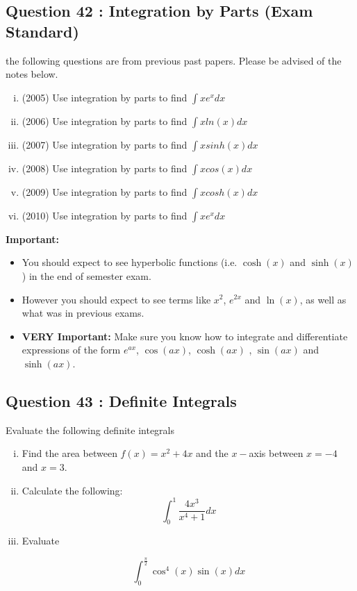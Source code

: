 \documentclass[]{article}
\begin{document}
\subsection*{Question 42 : Integration by Parts (Exam Standard)}	
the following questions are from previous past papers. Please be advised of the notes below.
\begin{enumerate}[(i)]
	\item (2005) Use integration by parts to find $\displaystyle{\int xe^xdx}$ 
	
	\item (2006) Use integration by parts to find $\displaystyle{\int x ln(x) dx}$ 
	
	\item (2007) Use integration by parts to find $\displaystyle{\int x sinh(x) dx}$ 
	
	\item (2008) Use integration by parts to find $\displaystyle{\int x cos(x) dx}$ 
	
	\item (2009) Use integration by parts to find $\displaystyle{\int x cosh(x) dx}$ 
	
	\item (2010) Use integration by parts to find $\displaystyle{\int xe^xdx}$ 
\end{enumerate}

\newpage
\begin{framed}
	\noindent \textbf{Important:	}
	\begin{itemize}
		\item You should expect to see hyperbolic functions (i.e. $\cosh(x)$ and $\sinh(x)$)  in the end of semester exam. 
		\item However you should expect to see terms like $ x^2$, $e^{2x}$ and $ \ln(x)$, as well as what was in previous exams.
		\item \textbf{VERY Important:} Make sure you know how to integrate and differentiate expressions of the form $e^{ax}$, $\cos(ax)$, $\cosh(ax)$ , $\sin(ax)$ and $\sinh(ax)$. 
	\end{itemize}
\end{framed}

\subsection*{Question 43 : Definite Integrals}
Evaluate the following definite integrals 

\begin{enumerate}[(i)]
	
	\item 
	Find the area between $f(x) = x^2 + 4x $ and the $x-$axis between 
	$x=-4$   and $ x=3$.
	
	\item Calculate the following:
	\[ \int^{1}_{0} \frac{4x^3}{x^4+1} dx \]
	
	
	\item Evaluate 
	
	\[ \int^{\frac{\pi}{2}}_{0} \cos^4(x) \sin(x) dx \]
\end{enumerate}
\end{document}
